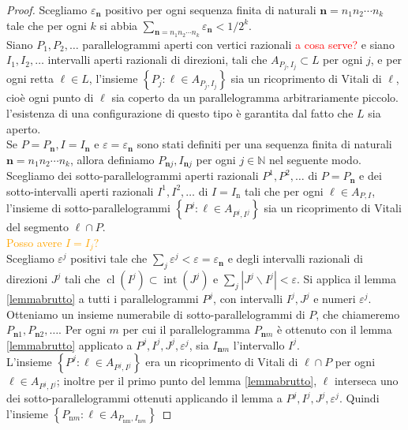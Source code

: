 \documentclass[a4paper, twoside,openright]{article}
\newcommand{\<}{\langle}
\renewcommand{\>}{\rangle}
\begin{document}
\begin{proof}
Scegliamo $\varepsilon_{\mathbf{n}}$ positivo per ogni sequenza finita di naturali $\mathbf{n}=n_{1} n_{2} \cdots n_{k}$ tale che per ogni $k$ si abbia $\sum_{\mathbf{n}=n_{1} n_{2} \cdots n_{k}} \varepsilon_{\mathbf{n}}<1 / 2^{k}$.\\
Siano $P_{1}, P_{2}, \ldots$ parallelogrammi aperti con vertici razionali \textcolor{red}{a cosa serve?} e siano $I_{1}, I_{2}, \ldots$ intervalli aperti razionali di direzioni, tali che $A_{P_{j}, I_{j}} \subset L$ per ogni $j$, e per ogni retta $\ell \in L$, l'insieme $\left\{P_{j}: \ell \in A_{P_{j}, I_{j}}\right\}$ sia un ricoprimento di Vitali di $\ell$, cioè ogni punto di $\ell$ sia coperto da un parallelogramma arbitrariamente piccolo. l'esistenza di una configurazione di questo tipo è garantita dal fatto che $L$ sia aperto.\\
Se $P=P_{\mathbf{n}}, I=I_{\mathbf{n}}$ e $\varepsilon=\varepsilon_{\mathbf{n}}$ sono stati definiti per una sequenza finita di naturali $\mathbf{n}=n_{1} n_{2} \cdots n_{k}$, allora definiamo $P_{\mathbf{n} j}, I_{\mathbf{n} j}$ per ogni $j \in \mathbb{N}$ nel seguente modo.\\
Scegliamo dei sotto-parallelogrammi aperti razionali $P^{1}, P^{2}, \ldots$ di $P=P_{\mathbf{n}}$ e dei sotto-intervalli aperti razionali $I^{1}, I^{2}, \ldots$ di $I=I_{\mathrm{n}}$ tali che per ogni $\ell \in A_{P, I}$, l'insieme di sotto-parallelogrammi $\left\{P^{j}: \ell \in A_{P^{j}, I^{j}}\right\}$
sia un ricoprimento di Vitali del segmento $\ell \cap P$. \\
\textcolor{orange}{Posso avere $I=I_j?$}\\
Scegliamo $\varepsilon^{j}$ positivi tale che $\sum_{j} \varepsilon^{j}<\varepsilon=\varepsilon_{\mathbf{n}}$ e degli intervalli razionali di direzioni $J^{j}$ tali che $\operatorname{cl}\left(I^{j}\right) \subset \operatorname{int}\left(J^{j}\right)$ e $\sum_{j}\left|J^{j} \backslash I^{j}\right|<\varepsilon$. Si applica il lemma \ref{lemmabrutto} a tutti i parallelogrammi $P^{j}$, con intervalli $I^{j}, J^{j}$ e numeri $\varepsilon^{j}$. Otteniamo un insieme numerabile di sotto-parallelogrammi di $P$, che chiameremo $P_{\mathbf{n} 1}, P_{\mathbf{n} 2}, \ldots$. Per ogni $m$ per cui il parallelogramma $P_{\mathbf{n} m}$ è ottenuto con il lemma \ref{lemmabrutto} applicato a $P^{j}, I^{j}, J^{j}, \varepsilon^{j}$, sia $I_{\mathbf{n} m}$ l'intervallo $I^{j}$.\\
L'insieme $\left\{P^{j}: \ell \in A_{P^{j}, I^{j}}\right\}$ era un ricoprimento di Vitali di $\ell \cap P$ per ogni $\ell \in A_{P^{j}, I^{j}}$; inoltre per il primo punto del lemma \ref{lemmabrutto}, $\ell$ interseca uno dei sotto-parallelogrammi ottenuti applicando il lemma a $P^{j}, I^{j}, J^{j}, \varepsilon^{j}$. Quindi l'insieme $\left\{P_{\mathrm{n} m}: \ell \in A_{P_{\mathrm{nm}}, I_{\mathrm{n} m}}\right\}$

\end{proof}
\end{document}
